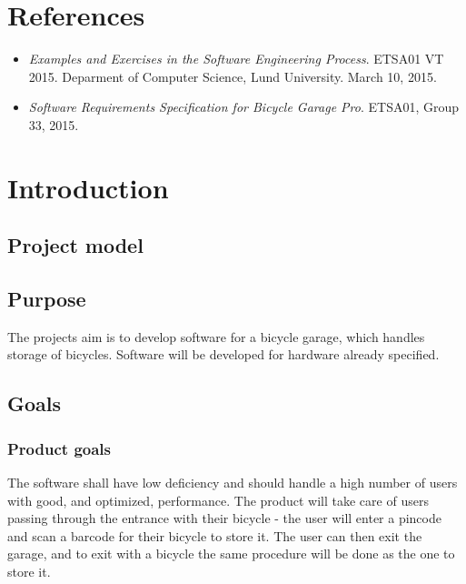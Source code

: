 \documentclass[12pt,titlepage]{article}
\begin{document}


\maketitle
\newpage
\tableofcontents
\thispagestyle{empty}
\setcounter{page}{0}
\newpage


\section{References}
\label{sec:references}

\begin{itemize}
	\item \textit{Examples and Exercises in the Software
		Engineering Process}. ETSA01 VT 2015. Deparment of Computer
		Science, Lund University. March 10, 2015.
	\item \textit{Software Requirements Specification for Bicycle Garage
		Pro}. ETSA01, Group 33, 2015.
\end{itemize}


\section{Introduction}

\subsection{Project model}

\subsection{Purpose}

The projects aim is to develop software for a bicycle garage, which handles
storage of bicycles. Software will be developed for hardware already specified.

\subsection{Goals}

\subsubsection{Product goals}
The software shall have low deficiency and should handle a high number of users
with good, and optimized, performance. The product will take care of users
passing through the entrance with their bicycle - the user will enter a pincode
and scan a barcode for their bicycle to store it. The user can then exit the
garage, and to exit with a bicycle the same procedure will be done as the one
to store it.
\end{document}
